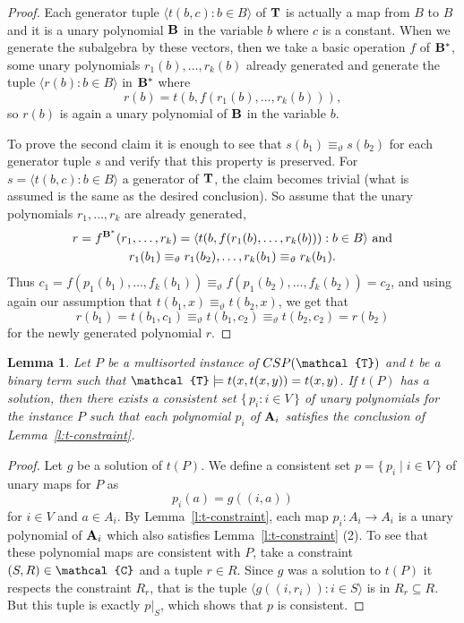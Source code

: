 \documentclass[11pt]{amsart}
\newcommand{\m}[1]{{\uppercase {\mathbf {#1}}}}
\newcommand{\sm}[1]{{\mbox{\scriptsize {\uppercase {\bf {#1}}}}}}
\newcommand{\vr}[1]{{\uppercase {\mathcal{#1}}}}
\newcommand{\lb}{\langle}
\newcommand{\rb}{\rangle}
\newtheorem{lm}[thm]{Lemma}
\theoremstyle{definition}
\begin{document}
\begin{proof}
Each generator tuple $\lb t(b,c) : b\in B \rb$ of $\m T$ is actually a map from $B$ to $B$ and it is a unary polynomial $\m B$ in the variable $b$ where $c$ is a constant. When we generate the subalgebra by these vectors, then we take a basic operation $f$ of $\m B^*$, some unary polynomials $r_1(b),\dots,r_k(b)$ already generated and generate the tuple $\lb r(b):b\in B\rb$ in $\m b^*$ where
\[r(b) = t(b,f(r_1(b),\dots,r_k(b))),\] 
so $r(b)$ is again a unary polynomial of $\m B$ in the variable $b$.

To prove the second claim it is enough to see that $s(b_1)\equiv_\vartheta s(b_2)$ for each generator tuple $s$ and verify that this property is preserved. For $s=\lb t(b,c):b\in B\rb$ a generator of $\m t$, the claim becomes trivial (what is assumed is the same as the desired conclusion). So assume that the unary polynomials $r_1,\dots,r_k$ are already generated, 
$$
\begin{gathered}
r=f^{\sm b^*}(r_1,\dots,r_k)=\lb t(b,f(r_1(b),\dots,r_k(b))):b\in B\rb
\text{ and}\\ 
r_1(b_1)\equiv_\vartheta r_1(b_2), \dots, r_k(b_1) \equiv_\vartheta  r_k(b_1).
\end{gathered}
$$ 
Thus $c_1 = f(p_1(b_1),\dots,f_k(b_1)) \equiv_\vartheta  f(p_1(b_2),\dots,f_k(b_2)) = c_2$, and using again our assumption that $t(b_1,x)\equiv_\vartheta t(b_2,x)$, we get that 
$$r(b_1)=t(b_1,c_1) \equiv_\vartheta t(b_1,c_2) \equiv_\vartheta t(b_2,c_2) = r(b_2)$$
for the newly generated polynomial $r$.
\end{proof}

\begin{lm}
\label{l:A-retraction}
Let $P$ be a multisorted instance of $CSP(\vr t)$ and $t$ be a binary term
such that $\vr t\models t(x,t(x,y)) = t(x,y)$.
If $t(P)$ has a solution, then there exists a consistent set $\{\, p_i : i\in V \,\}$ of unary polynomials for the instance $P$
such that each polynomial $p_i$ of $\m A_i$ satisfies the conclusion of Lemma~\ref{l:t-constraint}.
\end{lm}

\begin{proof}
Let $g$ be a solution of $t(P)$. We define a consistent set $p = \{\, p_i \mid i\in V \,\}$ of unary maps for $P$ as
\[ p_i(a) = g((i,a)) \]
for $i\in V$ and $a\in A_i$.
By Lemma~\ref{l:t-constraint}, each map $p_i : A_i\to A_i$ is a unary polynomial of $\m a_i$ which also satisfies Lemma~\ref{l:t-constraint} (2). To see that these polynomial maps are consistent with $P$, take a constraint $(S,R)\in \vr c$ and a tuple $r\in R$. Since $g$ was a solution to $t(P)$ it respects
the constraint $R_r$, that is the tuple $\lb g((i,r_i)) : i\in S\rb$ is in $R_r \subseteq R$. But this tuple is exactly $p|_S$, which shows that $p$ is consistent.
\end{proof}
\end{document}

